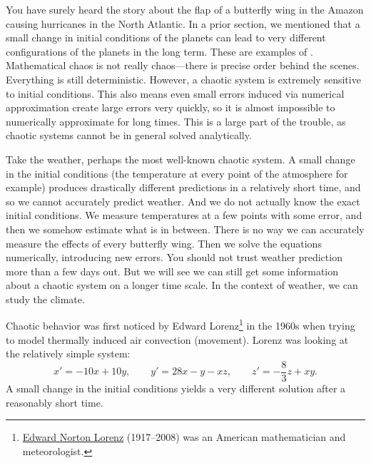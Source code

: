 

You have surely heard the story about the
flap of a butterfly wing in the Amazon causing hurricanes in the North
Atlantic.  In a prior section, we mentioned that a small change in
initial conditions of the planets can lead to very different configurations
of the planets in the long term.  These are examples of
\emph{}.
Mathematical chaos is not really chaos---there is precise order behind the
scenes.  Everything is still deterministic.  However, a chaotic system is extremely
sensitive to initial conditions.  This also means even small errors induced 
via numerical approximation create large errors very quickly, so it is
almost impossible to numerically approximate for long times.
This is a large part of
the trouble, as chaotic systems cannot be in general solved analytically.

Take the weather, perhaps the most well-known chaotic system.
A small change in the initial conditions
(the temperature at every point of the atmosphere for example) produces
drastically different predictions in a relatively short time, and so we cannot
accurately predict weather.  And we do not actually know the
exact initial conditions.  We measure temperatures at a few points with some
error, and then we somehow estimate what is in between.
There is no way we
can accurately measure the effects of every butterfly wing.
Then
we solve the equations numerically, introducing new errors.
You should not trust weather prediction more
than a few days out.
But we will see we can still get some information
about a chaotic system on a longer time scale.
In the context of weather, we can study the climate.

Chaotic behavior was first noticed by Edward
Lorenz\footnote{\href{https://en.wikipedia.org/wiki/Edward_Norton_Lorenz}{Edward Norton Lorenz} (1917--2008) was
an American mathematician and meteorologist.}
in the
1960s when trying to model thermally induced air convection (movement).
Lorenz was looking at the relatively simple system:
\begin{equation*}
x' = -10x +10y, \qquad y' = 28x-y-xz, \qquad z'=-\frac{8}{3}z + xy .
\end{equation*}
A small change in the initial conditions yields a very different solution
after a reasonably short time.

